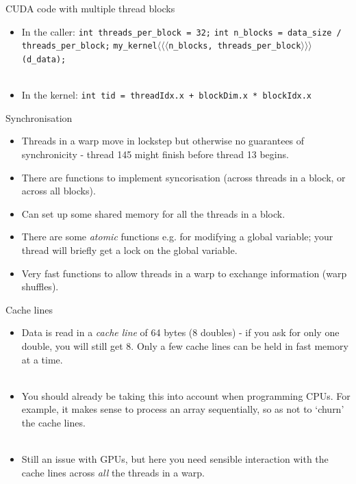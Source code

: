 \documentclass[usenames,dvipsnames]{beamer}
\begin{document}
\begin{frame}{CUDA code with multiple thread blocks}
  \begin{block}{}
    \begin{itemize}
      \item{In the caller:\newline
      \texttt{int threads\_per\_block = 32;}\newline
      \texttt{int n\_blocks = data\_size / threads\_per\_block;}\newline
      \texttt{my\_kernel}$\langle\langle\langle$\texttt{n\_blocks, threads\_per\_block}$\rangle\rangle\rangle$\texttt{(d\_data);}
      }\\~\
      \item{In the kernel:\newline
      \texttt{int tid = threadIdx.x + blockDim.x * blockIdx.x}
      }
    \end{itemize}
  \end{block}
\end{frame}


\begin{frame}{Synchronisation}
  \begin{block}{}
    \begin{itemize}
      \item{Threads in a warp move in lockstep but otherwise no guarantees of synchronicity - thread 145 might finish before thread 13 begins.}
      \item{There are functions to implement syncorisation (across threads in a block, or across all blocks).}
      \item{Can set up some shared memory for all the threads in a block.}
      \item{There are some \textit{atomic} functions e.g. for modifying a global variable; your thread will briefly get a lock on the global variable.}
      \item{Very fast functions to allow threads in a warp to exchange information (warp shuffles).}
    \end{itemize}
  \end{block}
\end{frame}

\begin{frame}{Cache lines}
  \begin{block}{}
    \begin{itemize}
      \item{Data is read in a \textit{cache line} of 64 bytes (8 doubles) - if you ask for only one double, you will still get 8. Only a few cache lines can be held in fast memory at a time.}\\~\
      \item{You should already be taking this into account when programming CPUs. For example, it makes sense to process an array sequentially, so as not to `churn' the cache lines.}\\~\
      \item{Still an issue with GPUs, but here you need sensible interaction with the cache lines across \textit{all} the threads in a warp.}
    \end{itemize}
  \end{block}
\end{frame}
\end{document}
